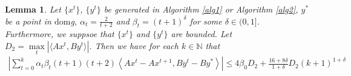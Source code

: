 \documentclass{article}
\numberwithin{equation}{section}
\newtheorem{lemma}{Lemma}[section]
\begin{document}
\begin{lemma} \label{lemma_of_sum_Axk-Axk+1}
    Let  $\{x^t\}$, $\{y^t\}$ be generated in Algorithm \ref{alg1} or Algorithm \ref{alg2}, $y^*$ be a point 
    in $\mathrm{dom}$g, $\alpha_t = \frac{2}{t+2}$ and $\beta_{t} =(t+1)^{\delta}$ for some $\delta \in (0,1]$. 
    Furthermore, we suppsoe that $\{x^t\}$ and $\{y^t\}$ are bounded. Let $D_2 =\max\limits_t \left| \langle Ax^t,By^t \rangle \right|$. 
    Then we have for each $k\in\mathbb{N}$ that  
    \begin{align}
        \left| \sum\limits_{t = 0}^k\alpha_t\beta_{t}(t+1)(t+2)\left\langle Ax^t- Ax^{t+1},By^t-By^* \right\rangle \right| 
        \leq 4\beta_0D_2 +\frac{16+8\delta}{1+\delta}D_2(k+1)^{1+\delta} \nonumber
    \end{align}
\end{lemma}
\end{document}
